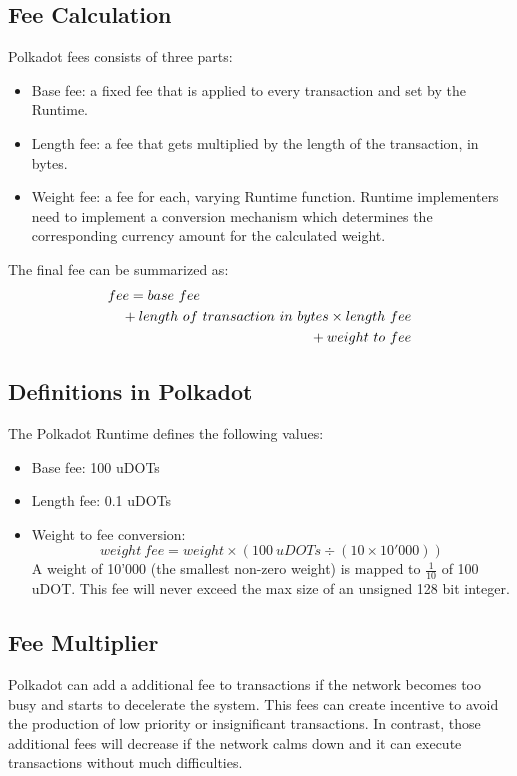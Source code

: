 \documentclass[11pt,a4paper]{article}
\begin{document}
\subsection{Fee Calculation}
Polkadot fees consists of three parts:

\begin{itemize}
\item Base fee: a fixed fee that is applied to every transaction and set by the Runtime.
\item Length fee: a fee that gets multiplied by the length of the transaction, in bytes.
\item Weight fee: a fee for each, varying Runtime function. Runtime implementers need to
      implement a conversion mechanism which determines the corresponding currency amount
      for the calculated weight.
\end{itemize}

The final fee can be summarized as:
\begin{eqnarray*}
\lefteqn{fee = base\ fee}\\
      &&{} + length\ of\ transaction\ in\ bytes \times length\ fee\\
      &&{} + weight\ to\ fee\\
\end{eqnarray*}

\subsection{Definitions in Polkadot}
The Polkadot Runtime defines the following values:
\begin{itemize}
\item Base fee: 100 uDOTs
\item Length fee: 0.1 uDOTs
\item Weight to fee conversion:
      $$
            weight\ fee = weight \times (100\ uDOTs \div (10 \times 10'000))
      $$
      A weight of 10'000 (the smallest non-zero weight) is mapped to $\frac{1}{10}$ of 100 uDOT.
      \newline
      This fee will never exceed the max size of an unsigned 128 bit integer.
\end{itemize}

\subsection{Fee Multiplier}
Polkadot can add a additional fee to transactions if the network becomes too busy and starts to
decelerate the system. This fees can create incentive to avoid the production of
low priority or insignificant transactions. In contrast, those additional fees will decrease if
the network calms down and it can execute transactions without much difficulties.
\newline
\end{document}
